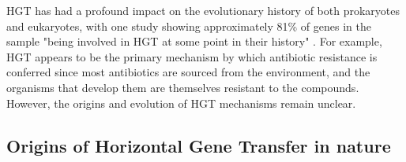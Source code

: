 \documentclass[PhD]{msu-thesis}
\begin{document}

HGT has had a profound impact on the evolutionary history of both prokaryotes and eukaryotes, with one study showing approximately 81\% of genes in the sample "being involved in HGT at some point in their history" \cite{dagan_modular_2008}. For example, HGT appears to be the primary mechanism by which antibiotic resistance is conferred \cite{davies_origins_1997,martinez_antibiotics_2008} since most antibiotics are sourced from the environment, and the organisms that develop them are themselves resistant to the compounds.
However, the origins and evolution of HGT mechanisms remain unclear. 

\subsection{Origins of Horizontal Gene Transfer in nature}
\end{document}
